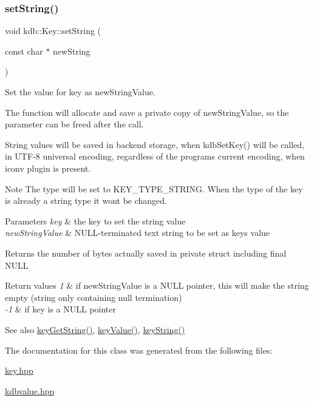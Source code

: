 \subsubsection{\texorpdfstring{setString()}{setString()}}
{\footnotesize\ttfamily void kdb\+::\+Key\+::set\+String (\begin{DoxyParamCaption}\item[{const char $\ast$}]{new\+String }\end{DoxyParamCaption})\hspace{0.3cm}{\ttfamily [inline]}}



Set the value for {\ttfamily key} as {\ttfamily new\+String\+Value}. 

The function will allocate and save a private copy of {\ttfamily new\+String\+Value}, so the parameter can be freed after the call.

String values will be saved in backend storage, when kdb\+Set\+Key() will be called, in U\+T\+F-\/8 universal encoding, regardless of the program\textquotesingle{}s current encoding, when iconv plugin is present.

\begin{DoxyNote}{Note}
The type will be set to K\+E\+Y\+\_\+\+T\+Y\+P\+E\+\_\+\+S\+T\+R\+I\+NG. When the type of the key is already a string type it won\textquotesingle{}t be changed.
\end{DoxyNote}

\begin{DoxyParams}{Parameters}
{\em key} & the key to set the string value \\
\hline
{\em new\+String\+Value} & N\+U\+L\+L-\/terminated text string to be set as {\ttfamily key\textquotesingle{}s} value \\
\hline
\end{DoxyParams}
\begin{DoxyReturn}{Returns}
the number of bytes actually saved in private struct including final N\+U\+LL 
\end{DoxyReturn}

\begin{DoxyRetVals}{Return values}
{\em 1} & if new\+String\+Value is a N\+U\+LL pointer, this will make the string empty (string only containing null termination) \\
\hline
{\em -\/1} & if key is a N\+U\+LL pointer \\
\hline
\end{DoxyRetVals}
\begin{DoxySeeAlso}{See also}
\mbox{\hyperlink{group__keyvalue_ga41b9fac5ccddafe407fc0ae1e2eb8778}{key\+Get\+String()}}, \mbox{\hyperlink{group__keyvalue_ga6f29609c5da53c6dc26a98678d5752af}{key\+Value()}}, \mbox{\hyperlink{group__keyvalue_ga880936f2481d28e6e2acbe7486a21d05}{key\+String()}} 
\end{DoxySeeAlso}


The documentation for this class was generated from the following files\+:\begin{DoxyCompactItemize}
\item 
\mbox{\hyperlink{key_8hpp}{key.\+hpp}}\item 
\mbox{\hyperlink{kdbvalue_8hpp}{kdbvalue.\+hpp}}\end{DoxyCompactItemize}
